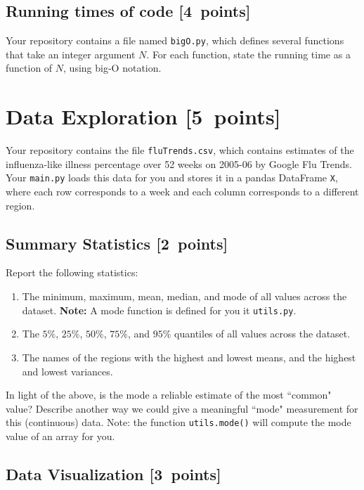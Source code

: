 \documentclass{article}
\newcommand{\blu}[1]{{\textcolor{blu}{#1}}}
\let\ask\blu
\newcommand\pts[1]{\textcolor{pointscolour}{[#1~points]}}
\begin{document}
  \subsection{Running times of code \pts{4}}

  Your repository contains a file named \texttt{bigO.py}, which defines several functions
  that take an integer argument $N$. For each function, \ask{state the running time as a function of $N$, using big-O notation}.


  \section{Data Exploration \pts{5}}


  Your repository contains the file \texttt{fluTrends.csv}, which contains estimates
  of the influenza-like illness percentage over 52 weeks on 2005-06 by Google Flu Trends.
  Your \texttt{main.py} loads this data for you and stores it in a pandas DataFrame \texttt{X},
  where each row corresponds to a week and each column
  corresponds to a different
  region. 

  \subsection{Summary Statistics \pts{2}}

  \ask{Report the following statistics}:
  \begin{enumerate}
  \item The minimum, maximum, mean, median, and mode of all values across the dataset. \textbf{Note:} A mode function is defined for you it \texttt{utils.py}. 
  \item The $5\%$, $25\%$, $50\%$, $75\%$, and $95\%$ quantiles of all values across the dataset.
  \item The names of the regions with the highest and lowest means, and the highest and lowest variances.
  \end{enumerate}
  In light of the above, \ask{is the mode a reliable estimate of the most ``common" value? Describe another way we could give a meaningful ``mode" measurement for this (continuous) data.} Note: the function \texttt{utils.mode()} will compute the mode value of an array for you.


  \subsection{Data Visualization \pts{3}}
\end{document}

